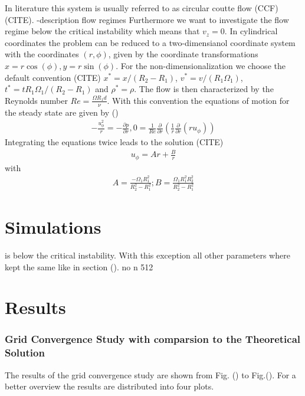 In literature this system is usually referred to as circular coutte flow (CCF) (CITE).
-description flow regimes
Furthermore we want to investigate the flow regime
below the critical instability which means that $v_z=0$. In cylindrical coordinates the problem can be reduced to a two-dimensianol coordinate system with
the coordinates $(r, \phi)$, given by the coordinate transformations $x=r\cos(\phi), y = r\sin(\phi)$.
For the non-dimensionalization we choose the default convention (CITE) $x^*=x/(R_2 - R_1)$, $v^*=v/(R_1\Omega_1)$, $t^*=tR_1\Omega_1/(R_2-R_1)$ and $\rho^*=\rho$.
The flow is then characterized by the Reynolds number $Re = \frac{\Omega R_1d}{\nu}$. With this convention the equations of motion for the steady state are given by ()
\begin{align}
    -\frac{u^2_\phi}{r} = - \frac{\partial p}{\partial r}, 0 = \frac{1}{Re}\frac{\partial}{\partial r}\left(\frac{1}{r}\frac{\partial}{\partial r}(r u_\phi)\right)
\end{align}
Integrating the equations twice leads to the solution (CITE)
\begin{align}
    u_\phi = Ar + \frac{B}{r}
\end{align}
with
\begin{align}
    A = \frac{-\Omega_1R_1^2}{R^2_2 - R^2_1} ; B = \frac{\Omega_1R^2_1 R^2_2}{R^2_2 - R^2_1}
\end{align}

\section{Simulations}
is below the critical instability. With this exception all other parameters where kept the same like in section ().
\clearpage
no n 512

\section{Results}

\subsubsection{Grid Convergence Study with comparsion to the Theoretical Solution}

The results of the grid convergence study are shown from Fig. () to Fig.().
For a better overview the results are distributed into four plots.

